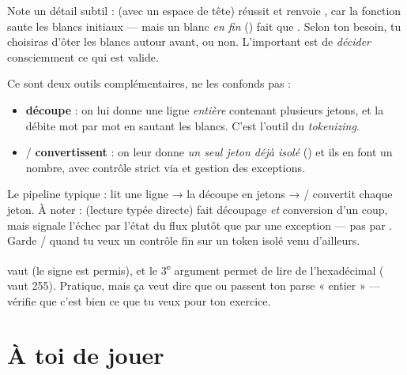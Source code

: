 \documentclass[11pt]{article}
\begin{document}
Note un détail subtil :  (avec un espace de tête) réussit
et renvoie , car la fonction saute les blancs initiaux — mais un blanc
\emph{en fin} () fait que . Selon ton besoin, tu
choisiras d'ôter les blancs autour avant, ou non. L'important est de
\emph{décider} consciemment ce qui est valide.

\begin{aretenir}
Ce sont deux outils complémentaires, ne les confonds pas :
\begin{itemize}[noitemsep]
    \item {} \textbf{découpe} : on lui donne une ligne
          \emph{entière} contenant plusieurs jetons, et \code{>>} la débite mot
          par mot en sautant les blancs. C'est l'outil du \emph{tokenizing}.
    \item {} /  \textbf{convertissent} : on leur
          donne \emph{un seul jeton déjà isolé} () et ils en font un
          nombre, avec contrôle strict via  et gestion des
          exceptions.
\end{itemize}
Le pipeline typique :  lit une ligne →  la
découpe en jetons → / convertit chaque jeton. À noter :
 (lecture typée directe) fait découpage \emph{et} conversion d'un
coup, mais signale l'échec par l'état du flux plutôt que par une exception — pas
par . Garde / quand tu veux un contrôle fin sur
un token isolé venu d'ailleurs.
\end{aretenir}

\begin{piege}
 vaut  (le signe est permis), et le 3\textsuperscript{e}
argument  permet de lire de l'hexadécimal (
vaut 255). Pratique, mais ça veut dire que  ou  passent ton
parse « entier » — vérifie que c'est bien ce que tu veux pour ton exercice.
\end{piege}

\section*{À toi de jouer}
\end{document}
